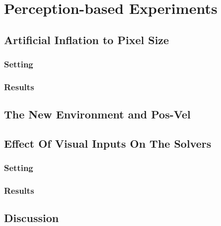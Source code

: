 \chapter{Perception-based Experiments}\label{chap:perception}

\section{Artificial Inflation to Pixel Size}

\subsection{Setting}

\subsection{Results}

\section{The New Environment and Pos-Vel}

\section{Effect Of Visual Inputs On The Solvers}

\subsection{Setting}

\subsection{Results}

\section{Discussion}